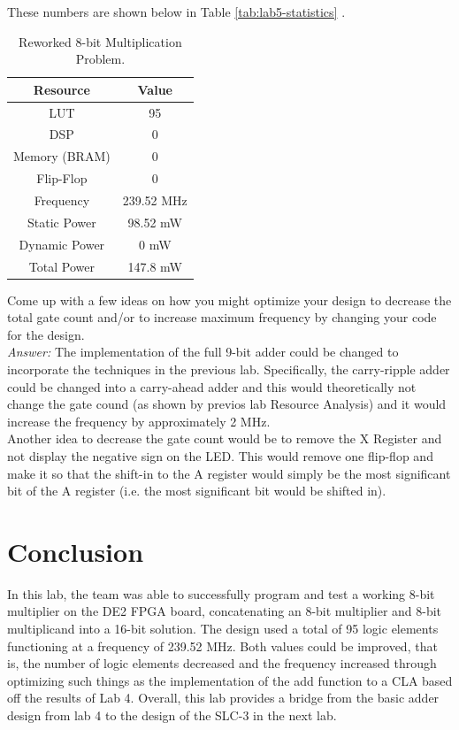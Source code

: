 \documentclass[journal, twocolumn, final,11pt,letterpaper]{IEEEtran}
\begin{document}
These numbers are shown below in Table \ref{tab:lab5-statistics} .

\begin{table}[htbp]
	\centering
	\caption{Reworked 8-bit Multiplication Problem. }
	\begin{tabular}{c|c}	%
		\toprule	%
		Resource & Value \\
		\midrule
		LUT & 95\\
		DSP & 0\\
		Memory (BRAM) & 0\\
		Flip-Flop & 0\\
		Frequency & 239.52 MHz\\
		Static Power & 98.52 mW\\
		Dynamic Power & 0 mW\\
		Total Power & 147.8 mW\\
		\bottomrule	%
	\end{tabular}%
	\label{tab:table2}	%
\end{table}%
 
Come up with a few ideas on how you might optimize your design to decrease the total gate count and/or to increase maximum frequency by changing your code for the design.\\

\textit{Answer:} The implementation of the full 9-bit adder could be changed to incorporate the techniques in the previous lab. Specifically, the carry-ripple adder could be changed into a carry-ahead adder and this would theoretically not change the gate cound (as shown by previos lab Resource Analysis) and it would increase the frequency by approximately 2 MHz. \\

Another idea to decrease the gate count would be to remove the X Register and not display the negative sign on the LED. This would remove one flip-flop and make it so that the shift-in to the A register would simply be the most significant bit of the A register (i.e. the most significant bit would be shifted in).

\section{Conclusion}
In this lab, the team was able to successfully program and test a working 8-bit multiplier on the DE2 FPGA board, concatenating an 8-bit multiplier and 8-bit multiplicand into a 16-bit solution.  The design used a total of 95 logic elements functioning at a frequency of 239.52 MHz.  Both values could be improved, that is, the number of logic elements decreased and the frequency increased through optimizing such things as the implementation of the add function to a CLA based off the results of Lab 4.  Overall, this lab provides a bridge from the basic adder design from lab 4 to the design of the SLC-3 in the next lab.    
\end{document}

